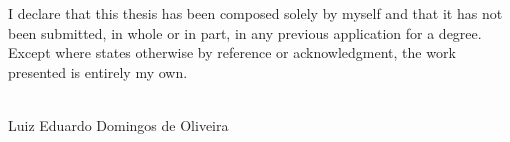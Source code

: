 I declare that this thesis has been composed solely by myself and that it has not been submitted, in whole or in part, in any previous application for a degree. Except where states otherwise by reference or acknowledgment, the work presented is entirely my own.
\\[3\baselineskip]
  
\hspace{7.5cm}
\begin{minipage}{0.5\textwidth}
    \begin{center}
    \begin{minipage}{8cm}
        \hrulefill
    \end{minipage}\\
    Luiz Eduardo Domingos de Oliveira
    \end{center}
\end{minipage}